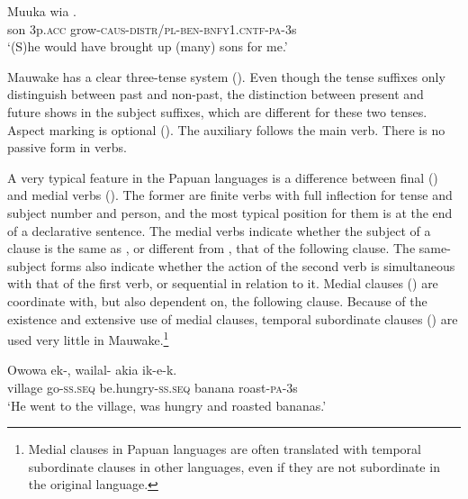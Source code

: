 \ea%
\label{ex:1:x664}
\gll Muuka  wia . \\
 son  3p.\textsc{acc}  grow-\textsc{caus}-\textsc{distr/pl}-\textsc{ben}-\textsc{bnfy1.cntf-pa}-3s     \\
\glt `(S)he would have brought up (many) sons for me.'
\z


Mauwake has a clear three-tense system (). Even though the tense suffixes only distinguish between past and non-past, the distinction between present and future shows in the subject suffixes, which are different for these two tenses.  Aspect marking is optional ().  The auxiliary follows the main verb. There is no passive form in verbs.

A very typical feature in the Papuan languages is a difference between final () and medial verbs (). The former are finite verbs with full inflection for tense and subject number and person, and the most typical position for them is at the end of a declarative sentence. The medial verbs indicate whether the subject of a clause is the same as , or different from , that of the following clause. The same-subject forms also indicate whether the action of the second verb is simultaneous with that of the first verb, or sequential  in relation to it. Medial clauses () are coordinate with, but also dependent on, the following clause. Because of the existence and extensive use of medial clauses, temporal subordinate clauses () are used very little in Mauwake.\footnote{Medial clauses in Papuan languages are often translated with temporal subordinate clauses in other languages, even if they are not subordinate in the original language.}

\ea%
\label{ex:1:x662}
\gll Owowa  ek-,  wailal-  akia  ik-e-k. \\
village  go-\textsc{ss.seq} be.hungry-\textsc{ss.seq} banana  roast-\textsc{pa}-3s      \\
\glt `He went to the village, was hungry and roasted bananas.'
\z


